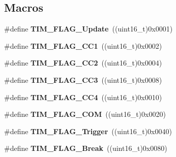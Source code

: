 \subsection*{Macros}
\begin{DoxyCompactItemize}
\item 
\mbox{\label{group___t_i_m___flags_ga97eba66f792c88e08131bd0d2a0e530d}} 
\#define {\bfseries T\+I\+M\+\_\+\+F\+L\+A\+G\+\_\+\+Update}~((uint16\+\_\+t)0x0001)
\item 
\mbox{\label{group___t_i_m___flags_gaa7eb8be054b9bd217a9abb1c8687cc55}} 
\#define {\bfseries T\+I\+M\+\_\+\+F\+L\+A\+G\+\_\+\+C\+C1}~((uint16\+\_\+t)0x0002)
\item 
\mbox{\label{group___t_i_m___flags_ga9cae242f1c51b31839ffc5bc007c82a7}} 
\#define {\bfseries T\+I\+M\+\_\+\+F\+L\+A\+G\+\_\+\+C\+C2}~((uint16\+\_\+t)0x0004)
\item 
\mbox{\label{group___t_i_m___flags_ga052c380f922219659810e4fceb574a7c}} 
\#define {\bfseries T\+I\+M\+\_\+\+F\+L\+A\+G\+\_\+\+C\+C3}~((uint16\+\_\+t)0x0008)
\item 
\mbox{\label{group___t_i_m___flags_gafd0dc57b56941f8b8250d66e289542db}} 
\#define {\bfseries T\+I\+M\+\_\+\+F\+L\+A\+G\+\_\+\+C\+C4}~((uint16\+\_\+t)0x0010)
\item 
\mbox{\label{group___t_i_m___flags_gad454d70205ce5bbf3b3c0e7e43d6df62}} 
\#define {\bfseries T\+I\+M\+\_\+\+F\+L\+A\+G\+\_\+\+C\+OM}~((uint16\+\_\+t)0x0020)
\item 
\mbox{\label{group___t_i_m___flags_gaeca2f17eea738dbec7eee8ecbe442814}} 
\#define {\bfseries T\+I\+M\+\_\+\+F\+L\+A\+G\+\_\+\+Trigger}~((uint16\+\_\+t)0x0040)
\item 
\mbox{\label{group___t_i_m___flags_ga166571a1d5ca2bfca5d923eaa22f6deb}} 
\#define {\bfseries T\+I\+M\+\_\+\+F\+L\+A\+G\+\_\+\+Break}~((uint16\+\_\+t)0x0080)
\item 
\mbox{\label{group___t_i_m___flags_ga38dfb7d1ed00af77d70bc3be28500108}} 

\end{DoxyCompactItemize}
